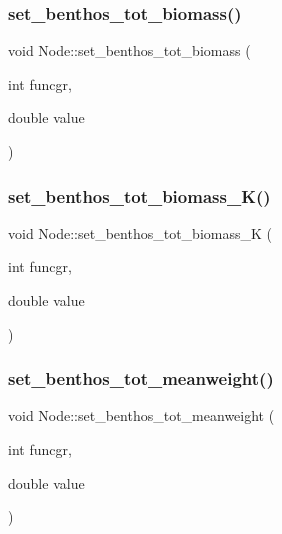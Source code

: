 \mbox{\label{class_node_ad4c8e255fd758deeaff3c2ad32a28628}} 
\subsubsection{\texorpdfstring{set\_benthos\_tot\_biomass()}{set\_benthos\_tot\_biomass()}}
{\footnotesize\ttfamily void Node\+::set\+\_\+benthos\+\_\+tot\+\_\+biomass (\begin{DoxyParamCaption}\item[{int}]{funcgr,  }\item[{double}]{value }\end{DoxyParamCaption})}

\mbox{\label{class_node_a4308ef8f4fb443d6ddc7523769d5bb5e}} 
\subsubsection{\texorpdfstring{set\_benthos\_tot\_biomass\_K()}{set\_benthos\_tot\_biomass\_K()}}
{\footnotesize\ttfamily void Node\+::set\+\_\+benthos\+\_\+tot\+\_\+biomass\+\_\+K (\begin{DoxyParamCaption}\item[{int}]{funcgr,  }\item[{double}]{value }\end{DoxyParamCaption})}

\mbox{\label{class_node_aec5dd8fca0a4b8773dc2565dc7419446}} 
\subsubsection{\texorpdfstring{set\_benthos\_tot\_meanweight()}{set\_benthos\_tot\_meanweight()}}
{\footnotesize\ttfamily void Node\+::set\+\_\+benthos\+\_\+tot\+\_\+meanweight (\begin{DoxyParamCaption}\item[{int}]{funcgr,  }\item[{double}]{value }\end{DoxyParamCaption})}

